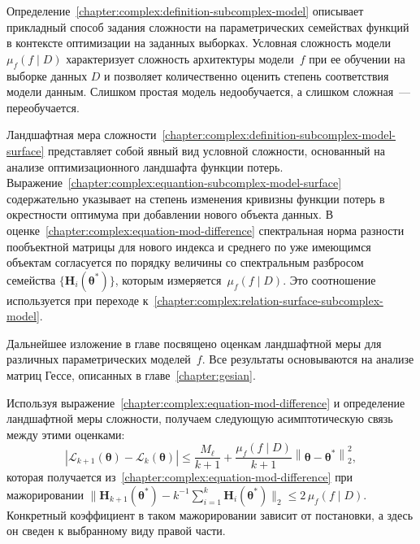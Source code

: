 Определение~\ref{chapter:complex:definition-subcomplex-model} описывает прикладный способ задания сложности на параметрических семействах функций в контексте оптимизации на заданных выборках.
Условная сложность модели~$\mu_f(f\mid D)$ характеризует сложность архитектуры модели~$f$ при ее обучении на выборке данных $D$ и позволяет количественно оценить степень соответствия модели данным. Слишком простая модель недообучается, а слишком сложная~--- переобучается.

Ландшафтная мера сложности~\ref{chapter:complex:definition-subcomplex-model-surface} представляет собой явный вид условной сложности, основанный на анализе оптимизационного ландшафта функции потерь. Выражение~\eqref{chapter:complex:equantion-subcomplex-model-surface} содержательно указывает на степень изменения кривизны функции потерь в окрестности оптимума при добавлении нового объекта данных.
В оценке~\eqref{chapter:complex:equation-mod-difference} спектральная норма разности пообъектной матрицы для нового индекса и среднего по уже имеющимся объектам согласуется по порядку величины со спектральным разбросом семейства $\{\mathbf{H}_i(\boldsymbol{\theta}^*)\}$, которым измеряется~$\mu_f(f\mid D)$. Это соотношение используется при переходе к~\eqref{chapter:complex:relation-surface-subcomplex-model}.

Дальнейшее изложение в главе посвящено оценкам ландшафтной меры для различных параметрических моделей~$f$.
Все результаты основываются на анализе матриц Гессе, описанных в главе~\ref{chapter:gesian}.

Используя выражение~\eqref{chapter:complex:equation-mod-difference} и определение ландшафтной меры сложности, получаем следующую асимптотическую связь между этими оценками:
\begin{equation}\label{chapter:complex:relation-surface-subcomplex-model}
    \left| \mathcal{L}_{k+1}(\boldsymbol{\theta}) - \mathcal{L}_k(\boldsymbol{\theta}) \right| \leqslant \frac{M_{\ell}}{k+1}+ \frac{\mu_f(f\mid D)}{k+1}\left\|\boldsymbol{\theta} - \boldsymbol{\theta}^*\right\|_2^2,
\end{equation}
которая получается из~\eqref{chapter:complex:equation-mod-difference} при мажорировании $\big\|\mathbf{H}_{k+1}(\boldsymbol{\theta}^*) - k^{-1}\sum_{i=1}^{k}\mathbf{H}_{i}(\boldsymbol{\theta}^*)\big\|_2 \leqslant 2\,\mu_f(f\mid D)$. Конкретный коэффициент в таком мажорировании зависит от постановки, а здесь он сведен к выбранному виду правой части.

